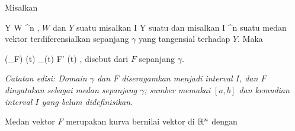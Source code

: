 {}
{

Misalkan

\mavergleichskette
{\vergleichskette
{ Y
}
{ \subseteq }{ W
}
{ \subseteq }{\R^n
}
{    }{
}
{   }{
}
}
{}{}{,} $W$
dan $Y$ suatu
misalkan
\maabbdisp {\gamma} {I} {Y
} {}
suatu
dan misalkan
 { I } { \R^n
} {}
suatu medan vektor terdiferensialkan sepanjang $\gamma$ yang tangensial terhadap $Y$. Maka

\mavergleichskettedisp
{\vergleichskette
{ (\nabla_\gamma F) (t)
}
{ } { \pi_{\gamma(t)} F' (t)
}
{ } {
}
{ } {
}
{ } {
}
}
{}{}{,}
disebut
dari $F$ sepanjang $\gamma$.

\emph{Catatan edisi: Domain $\gamma$ dan $F$ diseragamkan menjadi interval $I$, dan $F$ dinyatakan sebagai medan sepanjang $\gamma$; sumber memakai $[a,b]$ dan kemudian interval $I$ yang belum didefinisikan.}

}

Medan vektor $F$ merupakan kurva bernilai vektor di ${\mathbb R}^n$ dengan

